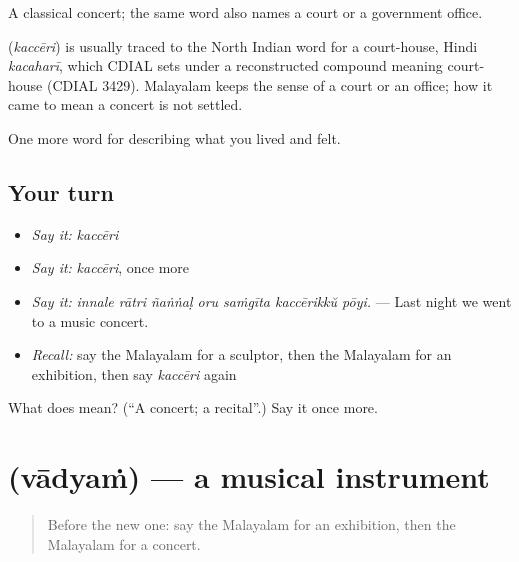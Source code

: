 A classical concert; the same word also names a court or a government office.

\begin{cousinweb}
\textbf{} (\emph{kaccēri}) is usually traced to the North Indian word for a court-house, Hindi \emph{kacaharī}, which CDIAL sets under a reconstructed compound meaning court-house (CDIAL 3429). Malayalam keeps the sense of a court or an office; how it came to mean a concert is not settled.
\end{cousinweb}

\begin{grammarlens}[title={What you've built}]
One more word for describing what you lived and felt.
\end{grammarlens}

\subsection*{Your turn}
\begin{itemize}
\raggedright
  \item \emph{Say it:} \emph{kaccēri}
  \item \emph{Say it:} \emph{kaccēri}, once more
  \item \emph{Say it:} \emph{innale rātri ñaṅṅaḷ oru saṁgīta kaccērikkŭ pōyi.} — Last night we went to a music concert.
  \item \emph{Recall:} say the Malayalam for a sculptor, then the Malayalam for an exhibition, then say \emph{kaccēri} again
\end{itemize}

\begin{tcolorbox}[breakable,colback=teal!4,colframe=teal!35!black,title={Before you move on}]
What does  mean? (\textquotedblleft{}A concert; a recital\textquotedblright{}.) Say it once more.
\end{tcolorbox}
\section[\texorpdfstring{\ml{വാദ്യം} (vādyaṁ)}{വാദ്യം (vādyaṁ)}]{ (vādyaṁ) — a musical instrument}

\label{lesson:ML-C561-vadyam}



\begin{quote}
Before the new one: say the Malayalam for an exhibition, then the Malayalam for a concert.
\end{quote}


